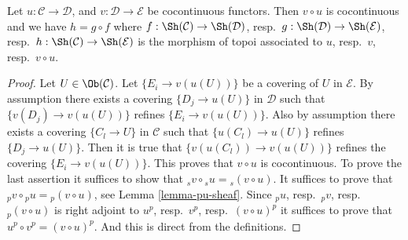 \begin{lemma}
\label{lemma-composition-cocontinuous}
Let $u : \mathcal{C} \to \mathcal{D}$, and $v : \mathcal{D} \to \mathcal{E}$
be cocontinuous functors. Then $v \circ u$ is cocontinuous and we
have $h = g \circ f$
where $f : \Sh(\mathcal{C}) \to \Sh(\mathcal{D})$,
resp.\ $g : \Sh(\mathcal{D}) \to \Sh(\mathcal{E})$,
resp.\ $h : \Sh(\mathcal{C}) \to \Sh(\mathcal{E})$ is the
morphism of topoi associated to $u$, resp.\ $v$, resp.\ $v \circ u$.
\end{lemma}

\begin{proof}
Let $U \in \Ob(\mathcal{C})$.
Let $\{E_i \to v(u(U))\}$ be a covering of $U$ in $\mathcal{E}$.
By assumption there exists a covering $\{D_j \to u(U)\}$ in $\mathcal{D}$
such that $\{v(D_j) \to v(u(U))\}$ refines $\{E_i \to v(u(U))\}$. Also
by assumption there exists a covering $\{C_l \to U\}$ in $\mathcal{C}$
such that $\{u(C_l) \to u(U)\}$ refines $\{D_j \to u(U)\}$. Then it is
true that $\{v(u(C_l)) \to v(u(U))\}$ refines the covering
$\{E_i \to v(u(U))\}$. This proves that $v \circ u$ is cocontinuous.
To prove the last assertion it suffices to show that
${}_sv \circ {}_su = {}_s(v \circ u)$. It suffices to prove that
${}_pv \circ {}_pu = {}_p(v \circ u)$, see Lemma \ref{lemma-pu-sheaf}.
Since ${}_pu$, resp.\ ${}_pv$, resp.\ ${}_p(v \circ u)$ is right adjoint to
$u^p$, resp.\ $v^p$, resp.\ $(v \circ u)^p$ it suffices to prove that
$u^p \circ v^p = (v \circ u)^p$. And this is direct from the definitions.
\end{proof}

